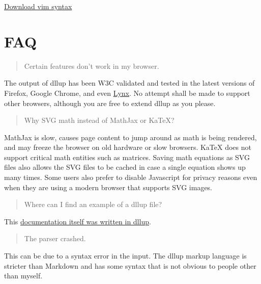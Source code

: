 \begin{center}\huge \href{https://bitbucket.org/dllu/dllup/raw/master/dllup.vim}{Download vim syntax}\end{center}
\section{FAQ}
\label{s5}
\begin{quote}
Certain features don't work in my browser.\end{quote}
The output of dllup has been W3C validated and tested in the latest versions of Firefox, Google Chrome, and even \href{https://en.wikipedia.org/wiki/Lynx_%28web_browser%29}{Lynx}. No attempt shall be made to support other browsers, although you are free to extend dllup as you please.

\begin{quote}
Why SVG math instead of MathJax or KaTeX?\end{quote}
MathJax is slow, causes page content to jump around as math is being rendered, and may freeze the browser on old hardware or slow browsers. KaTeX does not support critical math entities such as matrices. Saving math equations as SVG files also allows the SVG files to be cached in case a single equation shows up many times. Some users also prefer to disable Javascript for privacy reasons even when they are using a modern browser that supports SVG images.

\begin{quote}
Where can I find an example of a dllup file?\end{quote}
This \href{index.dllu}{documentation itself was written in dllup}.

\begin{quote}
The parser crashed.\end{quote}
This can be due to a syntax error in the input. The dllup markup language is stricter than Markdown and has some syntax that is not obvious to people other than myself.


